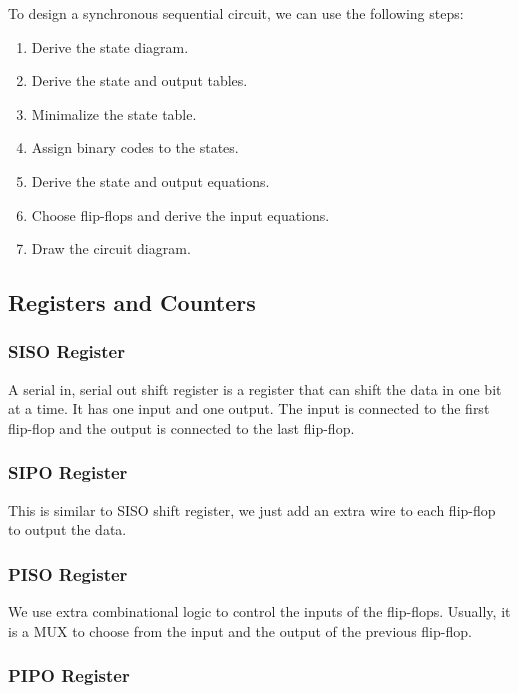 \documentclass[a4paper,12pt]{article}
\begin{document}
\vspace{1cm}
To design a synchronous sequential circuit, we can use the following steps:
\begin{enumerate}
	\item Derive the state diagram.
	\item Derive the state and output tables.
	\item Minimalize the state table.
	\item Assign binary codes to the states.
	\item Derive the state and output equations.
	\item Choose flip-flops and derive the input equations.
	\item Draw the circuit diagram.
\end{enumerate}

\subsection{Registers and Counters}

\subsubsection{SISO Register}

A serial in, serial out shift register is a register that can shift the data in one bit at a time.
It has one input and one output.
The input is connected to the first flip-flop and the output is connected to the last flip-flop.

\subsubsection{SIPO Register}

This is similar to SISO shift register, we just add an extra wire to each flip-flop to output the data.

\subsubsection{PISO Register}

We use extra combinational logic to control the inputs of the flip-flops.
Usually, it is a MUX to choose from the input and the output of the previous flip-flop.

\subsubsection{PIPO Register}
\end{document}
